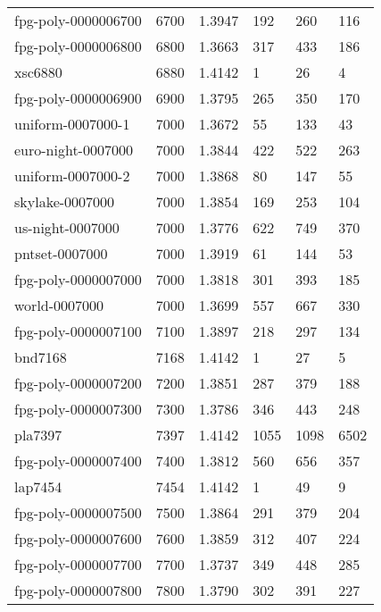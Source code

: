 \begin{longtable}{|lrrlll|}
fpg-poly-0000006700 & 6700 & \num{1.3947} & \num{192} & \num{260} & \num{116} \\
fpg-poly-0000006800 & 6800 & \num{1.3663} & \num{317} & \num{433} & \num{186} \\
xsc6880 & 6880 & \num{1.4142} & \num{1} & \num{26} & \num{4} \\
fpg-poly-0000006900 & 6900 & \num{1.3795} & \num{265} & \num{350} & \num{170} \\
uniform-0007000-1 & 7000 & \num{1.3672} & \num{55} & \num{133} & \num{43} \\
euro-night-0007000 & 7000 & \num{1.3844} & \num{422} & \num{522} & \num{263} \\
uniform-0007000-2 & 7000 & \num{1.3868} & \num{80} & \num{147} & \num{55} \\
skylake-0007000 & 7000 & \num{1.3854} & \num{169} & \num{253} & \num{104} \\
us-night-0007000 & 7000 & \num{1.3776} & \num{622} & \num{749} & \num{370} \\
pntset-0007000 & 7000 & \num{1.3919} & \num{61} & \num{144} & \num{53} \\
fpg-poly-0000007000 & 7000 & \num{1.3818} & \num{301} & \num{393} & \num{185} \\
world-0007000 & 7000 & \num{1.3699} & \num{557} & \num{667} & \num{330} \\
fpg-poly-0000007100 & 7100 & \num{1.3897} & \num{218} & \num{297} & \num{134} \\
bnd7168 & 7168 & \num{1.4142} & \num{1} & \num{27} & \num{5} \\
fpg-poly-0000007200 & 7200 & \num{1.3851} & \num{287} & \num{379} & \num{188} \\
fpg-poly-0000007300 & 7300 & \num{1.3786} & \num{346} & \num{443} & \num{248} \\
pla7397 & 7397 & \num{1.4142} & \num{1055} & \num{1098} & \num{6502} \\
fpg-poly-0000007400 & 7400 & \num{1.3812} & \num{560} & \num{656} & \num{357} \\
lap7454 & 7454 & \num{1.4142} & \num{1} & \num{49} & \num{9} \\
fpg-poly-0000007500 & 7500 & \num{1.3864} & \num{291} & \num{379} & \num{204} \\
fpg-poly-0000007600 & 7600 & \num{1.3859} & \num{312} & \num{407} & \num{224} \\
fpg-poly-0000007700 & 7700 & \num{1.3737} & \num{349} & \num{448} & \num{285} \\
fpg-poly-0000007800 & 7800 & \num{1.3790} & \num{302} & \num{391} & \num{227} \\

\end{longtable}
